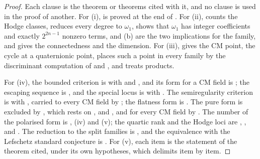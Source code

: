 \begin{proof}
Each clause is the theorem or theorems cited with it, and no clause is used
in the proof of another. For (i), \cite[Theorem~1.1]{paperI} is proved at the end of
\cite[Section~17.3]{paperI}. For (ii), \cite[Theorem~4.14]{paperI} counts the Hodge
classes, \cite[Corollary~4.15]{paperI} reduces every degree to $\omega_{1}$,
\cite[Theorem~4.9(i)]{paperI} shows that $\omega_{1}$ has integer coefficients
and exactly $2^{2n-1}$ nonzero terms, \cite[Theorem~15.14(a)]{paperI} and (b) are the
two implications for the family, and \cite[Proposition~B.8]{paperI} gives the
connectedness and the dimension. For (iii), \cite[Theorem~17.5]{paperI} gives the
CM point, \cite[Theorem~15.25(v)]{paperI} the cycle at a quaternionic point,
\cite[Theorem~15.27]{paperI} places such a point in every family by the
discriminant computation of \cite[Theorem~15.25(iv)]{paperI} and \cite[Lemma~15.26]{paperI},
and \cite[Theorem~15.10]{paperI} treats products.

For (iv), the bounded criterion is \cite[Theorem~16.9]{paperI} with
\cite[Theorem~16.17]{paperI} and \cite[Theorem~16.15]{paperI}, and its form for a CM field
is \cite[Theorem~17.7(iv)]{paperI}; the escaping sequence is \cite[Theorem~17.14]{paperI},
and the special locus is \cite[Proposition~17.12]{paperI} with
\cite[Corollary~17.13]{paperI}. The semiregularity criterion is
\cite[Theorem~2.3]{paperII} with \cite[Remark~3.6]{paperII}, carried to every CM field
by \cite[Theorem~17.7(v)]{paperI}; the flatness form is \cite[Proposition~3.15]{paperII}. The
pure form is excluded by \cite[Theorem~3.5]{paperII}, which rests on
\cite[Lemma~3.2]{paperII}, \cite[Lemma~3.3]{paperII} and
\cite[Proposition~3.4]{paperII}, and for every CM field by
\cite[Theorem~5.4]{paperII}. The number of the polarised form is
\cite[Theorem~3.9(i)]{paperII},
(iv) and (v); the quartic rank and the Hodge loci are
\cite[Theorem~5.14]{paperII}, \cite[Corollary~5.15]{paperII}, \cite[Proposition~5.17]{paperII}
and \cite[Corollary~5.18]{paperII}. The reduction to the split families is
, and the equivalence with the Lefschetz standard
conjecture is . For (v), each item is the statement of
the theorem cited, under its own hypotheses, which  delimits
item by item.


\end{proof}
